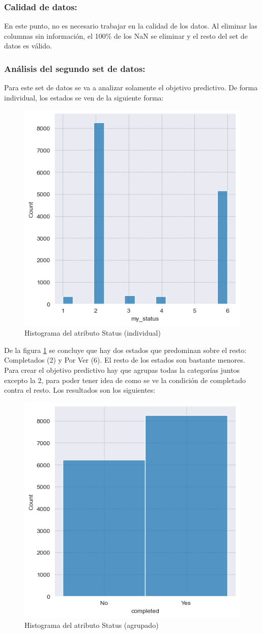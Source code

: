 \documentclass[a4paper]{article}
\begin{document}
\subsubsection{Calidad de datos:}
En este punto, no es necesario trabajar en la calidad de los datos. Al eliminar las columnas sin información, el 100\% de los NaN se eliminar y el resto del set de datos es válido.

\subsubsection{Análisis del segundo set de datos:}
Para este set de datos se va a analizar solamente el objetivo predictivo. De forma individual, los estados se ven de la siguiente forma:

\begin{figure}[hbtp!]
    \centering
    \includegraphics[width=0.5\linewidth]{Module_4_BigData//Proyecto//Propuestas//Imagenes/p2_dataset2_status_histogram.png}
    \caption{Histograma del atributo Status (individual)}
    \label{fig:hist_status_individual}
\end{figure}

De la figura \ref{fig:hist_status_individual} se concluye que hay dos estados que predominan sobre el resto: Completados (2) y Por Ver (6). El resto de los estados son bastante menores. Para crear el objetivo predictivo hay que agrupas todas la categorías juntos excepto la 2, para poder  tener idea de como se ve la condición de completado contra el resto. Los resultados son los siguientes:

\begin{figure}[hbtp!]
    \centering
    \includegraphics[width=0.5\linewidth]{Module_4_BigData//Proyecto//Propuestas//Imagenes/p2_dataset2_status_grouped_histogram.png}
    \caption{Histograma del atributo Status (agrupado)}
    \label{fig:hist_status_grouped}
\end{figure}
\end{document}
